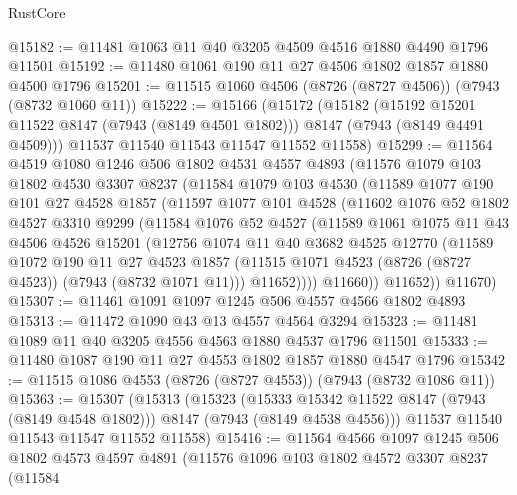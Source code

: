 \begin{lexlean}{RustCore}
\begin{coremodule}
@15182 := @11481 @1063 @11 @40 @3205 @4509 @4516 @1880 @4490 @1796 @11501
@15192 := @11480 @1061 @190 @11 @27 @4506 @1802 @1857 @1880 @4500 @1796
@15201 := @11515 @1060 @4506 (@8726 (@8727 @4506)) (@7943 (@8732 @1060 @11))
@15222 := @15166
    (@15172
      (@15182
        (@15192 @15201 @11522 @8147 (@7943 (@8149 @4501 @1802)))
        @8147
        (@7943 (@8149 @4491 @4509)))
      @11537
      @11540
      @11543
      @11547
      @11552
      @11558)
@15299 := @11564
    @4519
    @1080
    @1246
    @506
    @1802
    @4531
    @4557
    @4893
    (@11576
      @1079
      @103
      @1802
      @4530
      @3307
      @8237
      (@11584
        @1079
        @103
        @4530
        (@11589
          @1077
          @190
          @101
          @27
          @4528
          @1857
          (@11597
            @1077
            @101
            @4528
            (@11602
              @1076
              @52
              @1802
              @4527
              @3310
              @9299
              (@11584
                @1076
                @52
                @4527
                (@11589
                  @1061
                  @1075
                  @11
                  @43
                  @4506
                  @4526
                  @15201
                  (@12756
                    @1074
                    @11
                    @40
                    @3682
                    @4525
                    @12770
                    (@11589
                      @1072
                      @190
                      @11
                      @27
                      @4523
                      @1857
                      (@11515 @1071 @4523 (@8726 (@8727 @4523)) (@7943 (@8732 @1071 @11)))
                      @11652))))
              @11660))
          @11652))
      @11670)
@15307 := @11461 @1091 @1097 @1245 @506 @4557 @4566 @1802 @4893
@15313 := @11472 @1090 @43 @13 @4557 @4564 @3294
@15323 := @11481 @1089 @11 @40 @3205 @4556 @4563 @1880 @4537 @1796 @11501
@15333 := @11480 @1087 @190 @11 @27 @4553 @1802 @1857 @1880 @4547 @1796
@15342 := @11515 @1086 @4553 (@8726 (@8727 @4553)) (@7943 (@8732 @1086 @11))
@15363 := @15307
    (@15313
      (@15323
        (@15333 @15342 @11522 @8147 (@7943 (@8149 @4548 @1802)))
        @8147
        (@7943 (@8149 @4538 @4556)))
      @11537
      @11540
      @11543
      @11547
      @11552
      @11558)
@15416 := @11564
    @4566
    @1097
    @1245
    @506
    @1802
    @4573
    @4597
    @4891
    (@11576
      @1096
      @103
      @1802
      @4572
      @3307
      @8237
      (@11584

\end{coremodule}
\end{lexlean}
